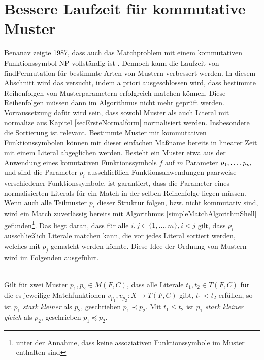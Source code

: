 \section{Bessere Laufzeit für kommutative Muster} \label{subsecCMuster}

Benanav zeigte 1987, dass auch das Matchproblem mit einem kommutativen Funktionssymbol NP-vollständig ist \cite{NPHardMatching}. Dennoch kann die Laufzeit von $\mathrm{findPermutation}$ für bestimmte Arten von Mustern verbessert werden. In diesem Abschnitt wird das versucht, indem a priori ausgeschlossen wird, dass bestimmte Reihenfolgen von Musterparametern erfolgreich matchen können. Diese Reihenfolgen müssen dann im Algorithmus nicht mehr geprüft werden.
Vorraussetzung dafür wird sein, dass sowohl Muster als auch Literal mit $\mathrm{normalize}$ aus Kapitel \ref{secErsteNormalform} normalisiert werden. Insbesondere die Sortierung ist relevant.
Bestimmte Muster mit kommutativen Funktionssymbolen können mit dieser einfachen Maßname bereits in linearer Zeit mit einem Literal abgeglichen werden. Besteht ein Muster etwa aus der Anwendung eines komutativen Funktionssymbols $f$ auf $m$ Parameter ${p}_{1}, \dots, {p}_{m}$ und sind die Parameter $p_i$ ausschließlich Funktionsanwendungen paarweise verschiedener Funktionssymbole, ist garantiert, dass die Parameter eines normalisierten Literals für ein Match in der selben Reihenfolge liegen müssen. Wenn auch alle Teilmuster $p_i$ dieser Struktur folgen, bzw. nicht kommutativ sind, wird ein Match zuverlässig bereits mit Algorithmus \ref{simpleMatchAlgorithmShell} gefunden\footnote{unter der Annahme, dass keine assoziativen Funktionssymbole im Muster enthalten sind}. Das liegt daran, dass für alle $i, j \in \{1, \dots, m\}, i < j$ gilt, dass $p_i$ ausschließlich Literale matchen kann, die vor jedes Literal sortiert werden, welches mit $p_j$ gematcht werden könnte. Diese Idee der Ordnung von Mustern wird im Folgenden ausgeführt.


\begin{definition}~\\
Gilt für zwei Muster $p_1, p_2 \in M(F, C)$, dass alle Literale $t_1, t_2 \in T(F, C)$ für die es jeweilige Matchfunktionen $v_{p_1}, v_{p_2} \colon X \rightarrow T(F, C)$ gibt, $t_1 < t_2$ erfüllen, so ist $p_1$ \emph{stark kleiner} als $p_2$, geschrieben $p_1 \prec p_2$. Mit  $t_1 \leq t_2$ ist $p_1$ \emph{stark kleiner gleich} als $p_2$, geschrieben $p_1 \preceq p_2$.
\end{definition}

